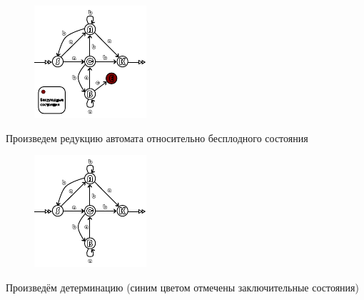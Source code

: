 \documentclass[a4paper, 14pt]{extarticle}
\begin{document}

\begin{figure}[h]
  \centering
  \includegraphics[page=1, scale=3.65]{graphics/diagramm1}
\end{figure}

\newpage
{}

\begin{center}
  Произведем редукцию автомата относительно бесплодного состояния
\end{center}

\begin{figure}[h]
  \centering
  \includegraphics[page=1, scale=3.65]{graphics/diagramm2}
\end{figure}

Произведём детерминацию (синим цветом отмечены заключительные состояния)
\end{document}
